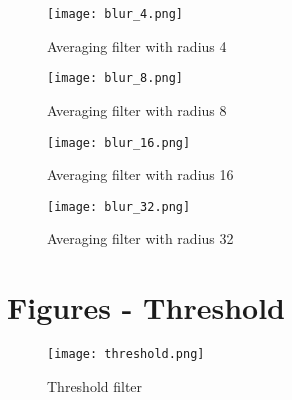 \documentclass[a4paper, 12pt]{article}
\begin{document}
\begin{figure}[hb]
        \centering
        \texttt{[image: blur\_4.png]}
        \caption{Averaging filter with radius 4}
        \label{fig:blur_4}
\end{figure}
\begin{figure}[hb]
        \centering
        \texttt{[image: blur\_8.png]}
        \caption{Averaging filter with radius 8}
        \label{fig:blur_8}
\end{figure}
\begin{figure}[hb]
        \centering
        \texttt{[image: blur\_16.png]}
        \caption{Averaging filter with radius 16}
        \label{fig:blur_16}
\end{figure}
\begin{figure}[hb]
        \centering
        \texttt{[image: blur\_32.png]}
        \caption{Averaging filter with radius 32}
        \label{fig:blur_32}
\end{figure}
\clearpage
\section{Figures - Threshold}
\label{sec:fig_thres}

\begin{figure}[h]
        \centering
        \texttt{[image: threshold.png]}
        \caption{Threshold filter}
        \label{fig:thres}
\end{figure}
\end{document}
